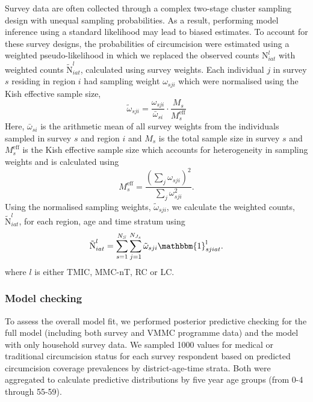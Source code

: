 \documentclass{article}
\begin{document}
\begin{appendix}
\noindent Survey data are often collected through a complex two-stage cluster sampling design with unequal sampling probabilities. As a result, performing model inference using a standard likelihood may lead to biased estimates. To account for these survey designs, the probabilities of circumcision were estimated using a weighted pseudo-likelihood in which we replaced the observed counts $\text{N}^l_{iat}$ with weighted counts $\tilde{\text{N}}^l_{iat}$, calculated using survey weights. Each individual $j$ in survey $s$ residing in region $i$ had sampling weight $\omega_{sji}$ which were normalised using the Kish effective sample size, 
\begin{equation*}
	\tilde\omega_{sji} = \frac{\omega_{sji}}{\bar{\omega}_{si}}\cdot \frac{M_s}{M^{\text{eff}}_s} 
\end{equation*}
Here, $\bar{\omega}_{si}$ is the arithmetic mean of all survey weights from the individuals sampled in survey $s$ and region $i$ and $M_s$ is the total sample size in survey $s$ and $M^{\text{eff}}_s$ is the Kish effective sample size which accounts for heterogeneity in sampling weights and is calculated using 
\begin{equation*}
	M^{\text{eff}}_s = \frac{(\sum_j \omega_{sji})^2}{\sum_j \omega_{sji}^{2}}.
\end{equation*}
Using the normalised sampling weights, $\tilde\omega_{sji}$, we calculate the weighted counts, $\tilde{\text{N}}^l_{iat}$, for each region, age and time stratum using 
\begin{equation*}
	\tilde{\text{N}}^{l}_{iat} = \sum_{s=1}^{N_S}\sum_{j=1}^{N_{J_s}}\tilde\omega_{sji} \mathbbm{1}^{\text{l}}_{sjiat}.
\end{equation*}
where $l$ is either TMIC, MMC-nT, RC or LC. 


\subsubsection*{Model checking}


To assess the overall model fit, we performed  posterior predictive checking for the full model (including both survey and VMMC programme data) and the model with only household survey data. We sampled 1000 values for medical or traditional circumcision status for each survey respondent based on predicted circumcision coverage prevalences by district-age-time strata. Both were aggregated to calculate predictive distributions by five year age groups (from 0-4 through 55-59).  


\end{appendix}
\end{document}

